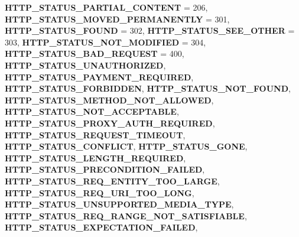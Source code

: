 \begin{DoxyCompactItemize}
{\bfseries H\+T\+T\+P\+\_\+\+S\+T\+A\+T\+U\+S\+\_\+\+P\+A\+R\+T\+I\+A\+L\+\_\+\+C\+O\+N\+T\+E\+NT} = 206, 
{\bfseries H\+T\+T\+P\+\_\+\+S\+T\+A\+T\+U\+S\+\_\+\+M\+O\+V\+E\+D\+\_\+\+P\+E\+R\+M\+A\+N\+E\+N\+T\+LY} = 301, 
{\bfseries H\+T\+T\+P\+\_\+\+S\+T\+A\+T\+U\+S\+\_\+\+F\+O\+U\+ND} = 302, 
\newline
{\bfseries H\+T\+T\+P\+\_\+\+S\+T\+A\+T\+U\+S\+\_\+\+S\+E\+E\+\_\+\+O\+T\+H\+ER} = 303, 
{\bfseries H\+T\+T\+P\+\_\+\+S\+T\+A\+T\+U\+S\+\_\+\+N\+O\+T\+\_\+\+M\+O\+D\+I\+F\+I\+ED} = 304, 
{\bfseries H\+T\+T\+P\+\_\+\+S\+T\+A\+T\+U\+S\+\_\+\+B\+A\+D\+\_\+\+R\+E\+Q\+U\+E\+ST} = 400, 
{\bfseries H\+T\+T\+P\+\_\+\+S\+T\+A\+T\+U\+S\+\_\+\+U\+N\+A\+U\+T\+H\+O\+R\+I\+Z\+ED}, 
\newline
{\bfseries H\+T\+T\+P\+\_\+\+S\+T\+A\+T\+U\+S\+\_\+\+P\+A\+Y\+M\+E\+N\+T\+\_\+\+R\+E\+Q\+U\+I\+R\+ED}, 
{\bfseries H\+T\+T\+P\+\_\+\+S\+T\+A\+T\+U\+S\+\_\+\+F\+O\+R\+B\+I\+D\+D\+EN}, 
{\bfseries H\+T\+T\+P\+\_\+\+S\+T\+A\+T\+U\+S\+\_\+\+N\+O\+T\+\_\+\+F\+O\+U\+ND}, 
{\bfseries H\+T\+T\+P\+\_\+\+S\+T\+A\+T\+U\+S\+\_\+\+M\+E\+T\+H\+O\+D\+\_\+\+N\+O\+T\+\_\+\+A\+L\+L\+O\+W\+ED}, 
\newline
{\bfseries H\+T\+T\+P\+\_\+\+S\+T\+A\+T\+U\+S\+\_\+\+N\+O\+T\+\_\+\+A\+C\+C\+E\+P\+T\+A\+B\+LE}, 
{\bfseries H\+T\+T\+P\+\_\+\+S\+T\+A\+T\+U\+S\+\_\+\+P\+R\+O\+X\+Y\+\_\+\+A\+U\+T\+H\+\_\+\+R\+E\+Q\+U\+I\+R\+ED}, 
{\bfseries H\+T\+T\+P\+\_\+\+S\+T\+A\+T\+U\+S\+\_\+\+R\+E\+Q\+U\+E\+S\+T\+\_\+\+T\+I\+M\+E\+O\+UT}, 
{\bfseries H\+T\+T\+P\+\_\+\+S\+T\+A\+T\+U\+S\+\_\+\+C\+O\+N\+F\+L\+I\+CT}, 
\newline
{\bfseries H\+T\+T\+P\+\_\+\+S\+T\+A\+T\+U\+S\+\_\+\+G\+O\+NE}, 
{\bfseries H\+T\+T\+P\+\_\+\+S\+T\+A\+T\+U\+S\+\_\+\+L\+E\+N\+G\+T\+H\+\_\+\+R\+E\+Q\+U\+I\+R\+ED}, 
{\bfseries H\+T\+T\+P\+\_\+\+S\+T\+A\+T\+U\+S\+\_\+\+P\+R\+E\+C\+O\+N\+D\+I\+T\+I\+O\+N\+\_\+\+F\+A\+I\+L\+ED}, 
{\bfseries H\+T\+T\+P\+\_\+\+S\+T\+A\+T\+U\+S\+\_\+\+R\+E\+Q\+\_\+\+E\+N\+T\+I\+T\+Y\+\_\+\+T\+O\+O\+\_\+\+L\+A\+R\+GE}, 
\newline
{\bfseries H\+T\+T\+P\+\_\+\+S\+T\+A\+T\+U\+S\+\_\+\+R\+E\+Q\+\_\+\+U\+R\+I\+\_\+\+T\+O\+O\+\_\+\+L\+O\+NG}, 
{\bfseries H\+T\+T\+P\+\_\+\+S\+T\+A\+T\+U\+S\+\_\+\+U\+N\+S\+U\+P\+P\+O\+R\+T\+E\+D\+\_\+\+M\+E\+D\+I\+A\+\_\+\+T\+Y\+PE}, 
{\bfseries H\+T\+T\+P\+\_\+\+S\+T\+A\+T\+U\+S\+\_\+\+R\+E\+Q\+\_\+\+R\+A\+N\+G\+E\+\_\+\+N\+O\+T\+\_\+\+S\+A\+T\+I\+S\+F\+I\+A\+B\+LE}, 
{\bfseries H\+T\+T\+P\+\_\+\+S\+T\+A\+T\+U\+S\+\_\+\+E\+X\+P\+E\+C\+T\+A\+T\+I\+O\+N\+\_\+\+F\+A\+I\+L\+ED}, 
\newline

\end{DoxyCompactItemize}
